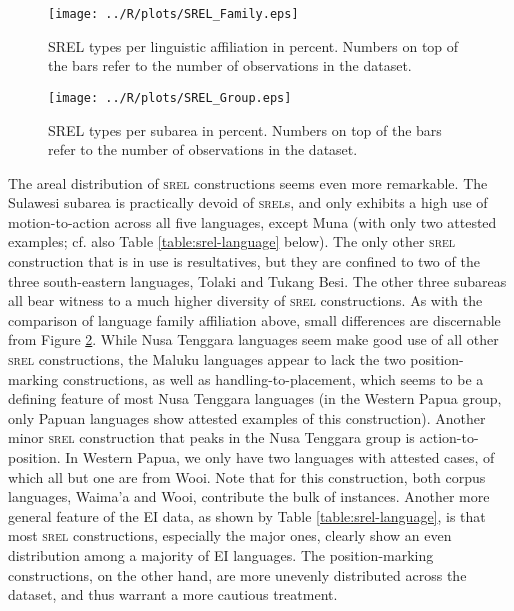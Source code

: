 \begin{figure}[ht]
\texttt{[image: ../R/plots/SREL\_Family.eps]}
\caption[SREL types per linguistic affiliation in percent]{SREL types per linguistic affiliation in percent. Numbers on top of the bars refer to the number of observations in the dataset.}\label{fig:srel-family}
\end{figure}
\begin{figure}[ht]
\texttt{[image: ../R/plots/SREL\_Group.eps]}
\caption[SREL types per subarea in percent]{SREL types per subarea in percent. Numbers on top of the bars refer to the number of observations in the dataset.}\label{fig:srel-group}
\end{figure}

The areal distribution of \textsc{srel} constructions seems even more remarkable. The Sulawesi subarea is practically devoid of \textsc{srel}s, and only exhibits a high use of motion-to-action across all five languages, except Muna (with only two attested examples; cf. also Table \ref{table:srel-language} below). The only other \textsc{srel} construction that is in use is resultatives, but they are confined to two of the three south-eastern languages, Tolaki and Tukang Besi. The other three subareas all bear witness to a much higher diversity of \textsc{srel} constructions. As with the comparison of language family affiliation above, small differences are discernable from Figure \ref{fig:srel-group}. While Nusa Tenggara languages seem make good use of all other \textsc{srel} constructions, the Maluku languages appear to lack the two position-marking constructions, as well as handling-to-placement, which seems to be a defining feature of most Nusa Tenggara languages (in the Western Papua group, only Papuan languages show attested examples of this construction). Another minor \textsc{srel} construction that peaks in the Nusa Tenggara group is action-to-position. In Western Papua, we only have two languages with attested cases, of which all but one are from Wooi. Note that for this construction, both corpus languages, Waima'a and Wooi, contribute the bulk of instances. Another more general feature of the EI data, as shown by Table \ref{table:srel-language}, is that most \textsc{srel} constructions, especially the major ones, clearly show an even distribution among a majority of EI languages. The position-marking constructions, on the other hand, are more unevenly distributed across the dataset, and thus warrant a more cautious treatment.

